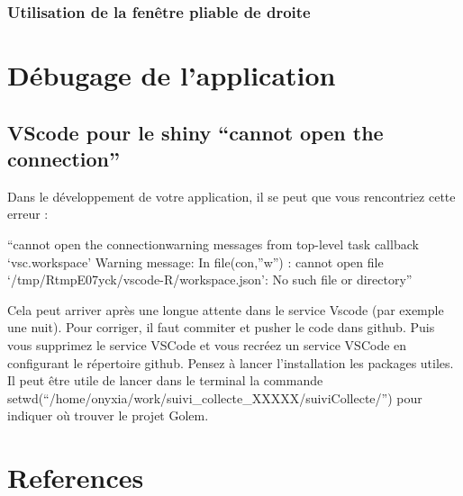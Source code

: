 \documentclass[
  letterpaper,
  DIV=11,
  numbers=noendperiod]{scrreprt}
\newlength{\cslhangindent}
\newlength{\cslentryspacingunit} %
\newenvironment{CSLReferences}[2] %
 {%
  \setlength{\parindent}{0pt}
  \ifodd #1
  \let\oldpar\par
  \def\par{\hangindent=\cslhangindent\oldpar}
  \fi
  \setlength{\parskip}{#2\cslentryspacingunit}
 }%
 {}
\begin{document}
\hypertarget{utilisation-de-la-fenuxeatre-pliable-de-droite}{%
\subsection{Utilisation de la fenêtre pliable de
droite}\label{utilisation-de-la-fenuxeatre-pliable-de-droite}}


\hypertarget{section}{%
\chapter{}\label{section}}


\hypertarget{section-1}{%
\chapter{}\label{section-1}}


\hypertarget{section-2}{%
\chapter{}\label{section-2}}


\hypertarget{duxe9bugage-de-lapplication}{%
\chapter{Débugage de l'application}\label{duxe9bugage-de-lapplication}}

\hypertarget{vscode-pour-le-shiny-cannot-open-the-connection}{%
\section{VScode pour le shiny ``cannot open the
connection''}\label{vscode-pour-le-shiny-cannot-open-the-connection}}

Dans le développement de votre application, il se peut que vous
rencontriez cette erreur :

``cannot open the connectionwarning messages from top-level task
callback `vsc.workspace' Warning message: In file(con,''w'') : cannot
open file `/tmp/RtmpE07yck/vscode-R/workspace.json': No such file or
directory''

Cela peut arriver après une longue attente dans le service Vscode (par
exemple une nuit). Pour corriger, il faut commiter et pusher le code
dans github. Puis vous supprimez le service VSCode et vous recréez un
service VSCode en configurant le répertoire github. Pensez à lancer
l'installation les packages utiles. Il peut être utile de lancer dans le
terminal la commande
setwd(``/home/onyxia/work/suivi\_collecte\_XXXXX/suiviCollecte/'') pour
indiquer où trouver le projet Golem.


\hypertarget{references}{%
\chapter*{References}\label{references}}

\hypertarget{refs}{}
\begin{CSLReferences}{0}{0}
\end{CSLReferences}



\printindex
\end{document}
